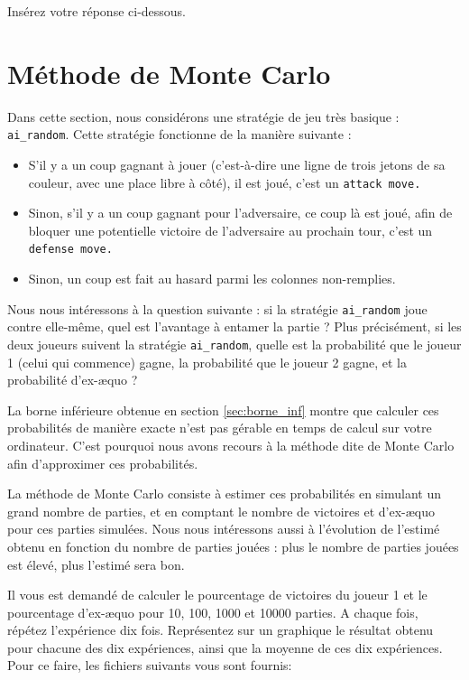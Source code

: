 \documentclass[11pt,answers]{exam}
\begin{document}
\begin{solutionbox}{210mm}
Insérez votre réponse ci-dessous.


\end{solutionbox}

\newpage

\section{Méthode de Monte Carlo}

Dans cette section, nous considérons une stratégie de jeu très basique : \texttt{ai\_random}. Cette stratégie fonctionne de la manière suivante :
\begin{itemize}
    \item S'il y a un coup gagnant à jouer (c'est-à-dire une ligne de trois jetons de sa couleur, avec une place libre à côté), il est joué, c'est un \texttt{attack move.}
    \item Sinon, s'il y a un coup gagnant pour l'adversaire, ce coup là est joué, afin de bloquer une potentielle victoire de l'adversaire au prochain tour, c'est un \texttt{defense move.}
    \item Sinon, un coup est fait au hasard parmi les colonnes non-remplies.
\end{itemize}

Nous nous intéressons à la question suivante : si la stratégie \texttt{ai\_random} joue contre elle-même, quel est l'avantage à entamer la partie ? Plus précisément, si les deux joueurs suivent la stratégie \texttt{ai\_random}, quelle est la probabilité que le joueur 1 (celui qui commence) gagne, la probabilité que le joueur 2 gagne, et la probabilité d'ex-æquo ?

La borne inférieure obtenue en section \ref{sec:borne_inf} montre que calculer ces probabilités de manière exacte n'est pas gérable en temps de calcul sur votre ordinateur. C'est pourquoi nous avons recours à la méthode dite de Monte Carlo afin d'approximer ces probabilités.

La méthode de Monte Carlo consiste à estimer ces probabilités en simulant un grand nombre de parties, et en comptant le nombre de victoires et d'ex-æquo pour ces parties simulées. Nous nous intéressons aussi à l'évolution de l'estimé obtenu en fonction du nombre de parties jouées : plus le nombre de parties jouées est élevé, plus l'estimé sera bon.

Il vous est demandé de calculer le pourcentage de victoires du joueur 1 et le pourcentage d'ex-æquo pour 10, 100, 1000 et 10000 parties. A chaque fois, répétez l'expérience dix fois. Représentez sur un graphique le résultat obtenu pour chacune des dix expériences, ainsi que la moyenne de ces dix expériences. Pour ce faire, les fichiers suivants vous sont fournis:
\end{document}
